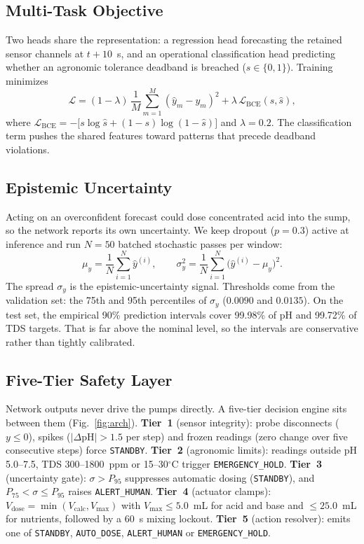 \subsection{Multi-Task Objective}
Two heads share the representation: a regression head forecasting the retained sensor channels at $t+10$~s, and an operational classification head predicting whether an agronomic tolerance deadband is breached ($s\in\{0,1\}$). Training minimizes
\begin{equation}
\mathcal{L}=(1-\lambda)\,\frac{1}{M}\sum_{m=1}^{M}(\hat y_m-y_m)^2 + \lambda\,\mathcal{L}_{\mathrm{BCE}}(s,\hat s),
\end{equation}
where $\mathcal{L}_{\mathrm{BCE}} = -\big[s\log\hat s+(1-s)\log(1-\hat s)\big]$ and $\lambda=0.2$. The classification term pushes the shared features toward patterns that precede deadband violations.

\subsection{Epistemic Uncertainty}
Acting on an overconfident forecast could dose concentrated acid into the sump, so the network reports its own uncertainty. We keep dropout ($p=0.3$) active at inference \cite{gal2016} and run $N=50$ batched stochastic passes per window:
\begin{equation}
\mu_y=\frac{1}{N}\sum_{i=1}^{N}\hat y^{(i)},\qquad
\sigma_y^2=\frac{1}{N}\sum_{i=1}^{N}\big(\hat y^{(i)}-\mu_y\big)^2 .
\end{equation}
The spread $\sigma_y$ is the epistemic-uncertainty signal. Thresholds come from the validation set: the 75th and 95th percentiles of $\sigma_y$ ($0.0090$ and $0.0135$). On the test set, the empirical 90\% prediction intervals cover 99.98\% of pH and 99.72\% of TDS targets. That is far above the nominal level, so the intervals are conservative rather than tightly calibrated.

\subsection{Five-Tier Safety Layer}
Network outputs never drive the pumps directly. A five-tier decision engine sits between them (Fig.~\ref{fig:arch}). \textbf{Tier~1} (sensor integrity): probe disconnects ($y\le0$), spikes ($|\Delta\mathrm{pH}|>1.5$ per step) and frozen readings (zero change over five consecutive steps) force \texttt{STANDBY}. \textbf{Tier~2} (agronomic limits): readings outside pH 5.0--7.5, TDS 300--1800~ppm or 15--30$^\circ$C trigger \texttt{EMERGENCY\_HOLD}. \textbf{Tier~3} (uncertainty gate): $\sigma>P_{95}$ suppresses automatic dosing (\texttt{STANDBY}), and $P_{75}<\sigma\le P_{95}$ raises \texttt{ALERT\_HUMAN}. \textbf{Tier~4} (actuator clamps): $V_{\text{dose}}=\min(V_{\text{calc}},V_{\max})$ with $V_{\max}\le5.0$~mL for acid and base and $\le25.0$~mL for nutrients, followed by a 60~s mixing lockout. \textbf{Tier~5} (action resolver): emits one of \texttt{STANDBY}, \texttt{AUTO\_DOSE}, \texttt{ALERT\_HUMAN} or \texttt{EMERGENCY\_HOLD}.

